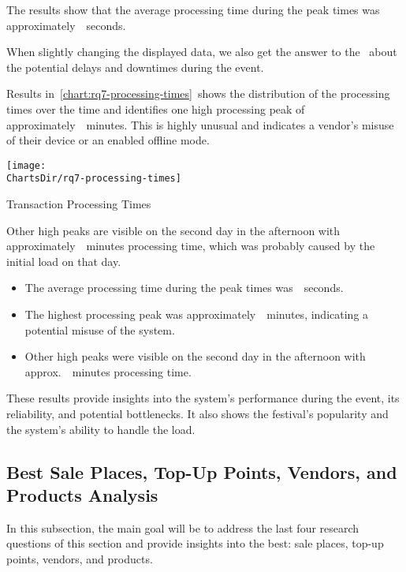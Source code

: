 The results show that the average processing time during the peak times was approximately~~seconds.

When slightly changing the displayed data, we also get the answer to the~ about the potential delays and downtimes during the event.


Results in~\autoref{chart:rq7-processing-times}~shows the distribution of the processing times over the time and identifies one high processing peak of approximately~~minutes.
This is highly unusual and indicates a vendor's misuse of their device or an enabled offline mode.

\begin{chart}[h]
	\centering
	\texttt{[image: \\ChartsDir/rq7-processing-times]}
	\caption{ Transaction Processing Times}
	\label{chart:rq7-processing-times}
	\source
\end{chart}

Other high peaks are visible on the second day in the afternoon with approximately~~minutes processing time, which was probably caused by the initial load on that day.

\begin{keytakeaways}
	\begin{itemize}
		\item The average processing time during the peak times was~~seconds.
		\item The highest processing peak was approximately~~minutes, indicating a potential misuse of the system.
		\item Other high peaks were visible on the second day in the afternoon with approx.~~minutes processing time.
	\end{itemize}
\end{keytakeaways}

These results provide insights into the system's performance during the event, its reliability, and potential bottlenecks.
It also shows the festival's popularity and the system's ability to handle the load.


\subsection{Best Sale Places, Top-Up Points, Vendors, and Products Analysis}
\label{subsec:analysis-performance-indicators-best}
In this subsection, the main goal will be to address the last four research questions of this section and provide insights into the best: sale places, top-up points, vendors, and products.

